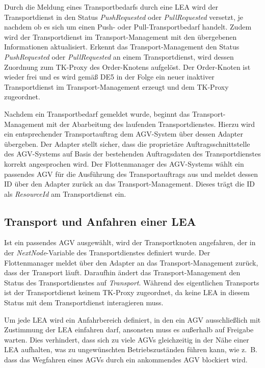 Durch die Meldung eines Transportbedarfs durch eine LEA wird der Transportdienst in den Status \emph{PushRequested} oder \emph{PullRequested} versetzt, je nachdem ob es sich um einen Push- oder Pull-Transportbedarf handelt. Zudem wird der Transportdienst im Transport-Management mit den übergebenen Informationen aktualisiert. Erkennt das Transport-Management den Status \emph{PushRequested} oder \emph{PullRequested} an einem Transportdienst, wird dessen Zuordnung zum TK-Proxy des Order-Knotens aufgelöst. Der Order-Knoten ist wieder frei und es wird gemäß DE5 in der Folge ein neuer inaktiver Transportdienst im Transport-Management erzeugt und dem TK-Proxy zugeordnet.

Nachdem ein Transportbedarf gemeldet wurde, beginnt das Transport-Management mit der Abarbeitung des laufenden Transportdienstes. Hierzu wird ein entsprechender Transportauftrag dem AGV-System über dessen Adapter übergeben. Der Adapter stellt sicher, dass die proprietäre Auftragsschnittstelle des AGV-Systems auf Basis der bestehenden Auftragsdaten des Transportdienstes korrekt angesprochen wird. Der Flottenmanager des AGV-Systems wählt ein passendes AGV für die Ausführung des Transportauftrags aus und meldet dessen ID über den Adapter zurück an das Transport-Management. Dieses trägt die ID als \emph{ResourceId} am Transportdienst ein.

\subsection{Transport und Anfahren einer LEA}
\label{subsec:TransportAnfahrenLea}

Ist ein passendes AGV ausgewählt, wird der Transportknoten angefahren, der in der \emph{NextNode}-Variable des Transportdienstes definiert wurde. Der Flottenmanager meldet über den Adapter an das Transport-Management zurück, dass der Transport läuft. Daraufhin ändert das Transport-Management den Status des Transportdienstes auf \emph{Transport}. Während des eigentlichen Transports ist der Transportdienst keinem TK-Proxy zugeordnet, da keine LEA in diesem Status mit dem Transportdienst interagieren muss. 

\pagebreak

Um jede LEA wird ein Anfahrbereich definiert, in den ein AGV ausschließlich mit Zustimmung der LEA einfahren darf, ansonsten muss es außerhalb auf Freigabe warten. Dies verhindert, dass sich zu viele AGVs gleichzeitig in der Nähe einer LEA aufhalten, was zu ungewünschten Betriebszuständen führen kann, wie z.~B. dass das Wegfahren eines AGVs durch ein ankommendes AGV blockiert wird. 

